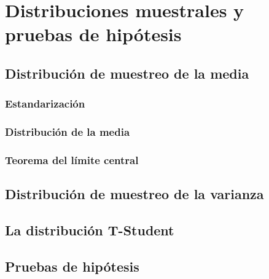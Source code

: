 \documentclass[
]{book}
\theoremstyle{definition}
\theoremstyle{definition}
\theoremstyle{definition}
\theoremstyle{definition}
\theoremstyle{remark}
\begin{document}
\hypertarget{distribuciones-muestrales-y-pruebas-de-hipuxf3tesis}{%
\chapter{Distribuciones muestrales y pruebas de hipótesis}\label{distribuciones-muestrales-y-pruebas-de-hipuxf3tesis}}

\hypertarget{distribuciuxf3n-de-muestreo-de-la-media}{%
\section{Distribución de muestreo de la media}\label{distribuciuxf3n-de-muestreo-de-la-media}}

\hypertarget{estandarizaciuxf3n}{%
\subsection{Estandarización}\label{estandarizaciuxf3n}}

\hypertarget{distribuciuxf3n-de-la-media}{%
\subsection{Distribución de la media}\label{distribuciuxf3n-de-la-media}}

\hypertarget{teorema-del-luxedmite-central}{%
\subsection{Teorema del límite central}\label{teorema-del-luxedmite-central}}

\hypertarget{distribuciuxf3n-de-muestreo-de-la-varianza}{%
\section{Distribución de muestreo de la varianza}\label{distribuciuxf3n-de-muestreo-de-la-varianza}}

\hypertarget{la-distribuciuxf3n-t-student}{%
\section{La distribución T-Student}\label{la-distribuciuxf3n-t-student}}

\hypertarget{prueba}{%
\section{Pruebas de hipótesis}\label{prueba}}
\end{document}
